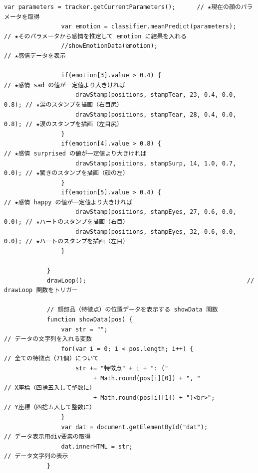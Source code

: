 \documentclass[mingoth,11pt,a4j,uplatex]{jsarticle}
\begin{document}
\begin{lstlisting}[caption=07-06.html]
                var parameters = tracker.getCurrentParameters();      // ★現在の顔のパラメータを取得
                var emotion = classifier.meanPredict(parameters);     // ★そのパラメータから感情を推定して emotion に結果を入れる
                //showEmotionData(emotion);                             // ★感情データを表示

                if(emotion[3].value > 0.4) {                          // ★感情 sad の値が一定値より大きければ
                    drawStamp(positions, stampTear, 23, 0.4, 0.0, 0.8); // ★涙のスタンプを描画（右目尻）
                    drawStamp(positions, stampTear, 28, 0.4, 0.0, 0.8); // ★涙のスタンプを描画（左目尻）
                }
                if(emotion[4].value > 0.8) {                          // ★感情 surprised の値が一定値より大きければ
                    drawStamp(positions, stampSurp, 14, 1.0, 0.7, 0.0); // ★驚きのスタンプを描画（顔の左）
                }
                if(emotion[5].value > 0.4) {                          // ★感情 happy の値が一定値より大きければ
                    drawStamp(positions, stampEyes, 27, 0.6, 0.0, 0.0); // ★ハートのスタンプを描画（右目）
                    drawStamp(positions, stampEyes, 32, 0.6, 0.0, 0.0); // ★ハートのスタンプを描画（左目）
                }
                
            }
            drawLoop();                                             // drawLoop 関数をトリガー
            
            // 顔部品（特徴点）の位置データを表示する showData 関数
            function showData(pos) {
                var str = "";                                         // データの文字列を入れる変数
                for(var i = 0; i < pos.length; i++) {                 // 全ての特徴点（71個）について
                    str += "特徴点" + i + ": ("
                         + Math.round(pos[i][0]) + ", "                 // X座標（四捨五入して整数に）
                         + Math.round(pos[i][1]) + ")<br>";             // Y座標（四捨五入して整数に）
                }
                var dat = document.getElementById("dat");             // データ表示用div要素の取得
                dat.innerHTML = str;                                  // データ文字列の表示
            }


\end{lstlisting}
\end{document}
